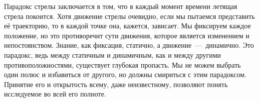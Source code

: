 
Парадокс стрелы заключается в том, что в каждый момент времени летящая стрела покоится. Хотя движение стрелы очевидно, если мы пытаемся представить её траекторию, то в каждой точке она, кажется, зависает. Мы фиксируем каждое положение, но это противоречит сути движения, которое является изменением и непостоянством. Знание, как фиксация, статично, а движение~---~динамично. Это парадокс, ведь между статичным и динамичным, как и между другими противоположностями, существует глубокая пропасть. Мы не можем выбрать один полюс и избавиться от другого, но должны смириться с этим парадоксом. Принятие его и открытость всему, даже неизвестному, позволяют понять исследуемое во всей его полноте.

